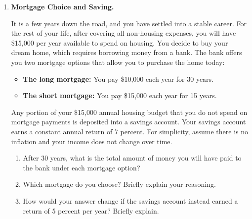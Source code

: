 \documentclass[12pt]{article}
\begin{document}
\begin{enumerate}

    \item \textbf{Mortgage Choice and Saving.}

          It is a few years down the road, and you have settled into a stable career. For the rest of your life, after covering all non-housing expenses, you will have \$15{,}000 per year available to spend on housing. You decide to buy your dream home, which requires borrowing money from a bank. The bank offers you two mortgage options that allow you to purchase the home today:

          \begin{itemize}
              \item \textbf{The long mortgage:} You pay \$10{,}000 each year for 30 years.
              \item \textbf{The short mortgage:} You pay \$15{,}000 each year for 15 years.
          \end{itemize}

          Any portion of your \$15{,}000 annual housing budget that you do not spend on mortgage
          payments is deposited into a savings account. Your savings account earns a constant
          annual return of 7 percent. For simplicity, assume there is no inflation and your
          income does not change over time.

          \begin{enumerate}
              \item After 30 years, what is the total amount of money you will have paid to the bank
                    under each mortgage option?

              \item Which mortgage do you choose? Briefly explain your reasoning.

              \item How would your answer change if the savings account instead earned a return of
                    5 percent per year? Briefly explain.
          \end{enumerate}

\end{enumerate}
\end{document}
